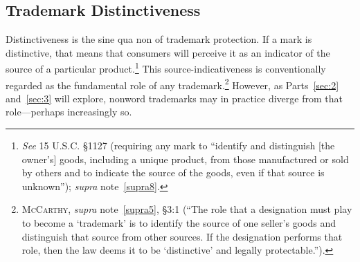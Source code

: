 \documentclass[letterpaper, 11pt, oneside]{article}
\begin{document}
\subsection{Trademark Distinctiveness} \label{subsec:1B}

Distinctiveness is the sine qua non of trademark protection. If a mark is distinctive, that means that consumers will perceive it as an indicator of the source of a particular product.\footnote{\textit{See} 15 U.S.C. \S 1127 (requiring any mark to ``identify and distinguish [the owner's] goods, including a unique product, from those manufactured or sold by others and to indicate the source of the goods, even if that source is unknown''); \textit{supra} note~\ref{supra8}.} This source-indicativeness is conventionally regarded as the fundamental role of any trademark.\footnote{\textsc{McCarthy}, \textit{supra} note~\ref{supra5}, \S 3:1 (``The role that a designation must play to become a `trademark' is to identify the source of one seller's goods and distinguish that source from other sources. If the designation performs that role, then the law deems it to be `distinctive' and legally protectable.'').}  However, as Parts~\ref{sec:2} and~\ref{sec:3} will explore, nonword trademarks may in practice diverge from that role—perhaps increasingly so.
\end{document}
